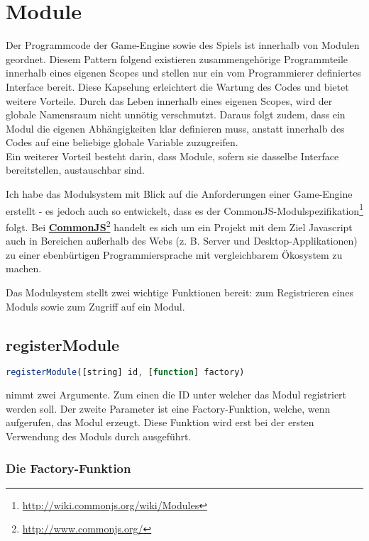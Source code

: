 \chapter{Module}

Der Programmcode der Game-Engine sowie des Spiels ist innerhalb von Modulen geordnet. Diesem Pattern folgend existieren zusammengehörige Programmteile innerhalb eines eigenen Scopes und stellen nur ein vom Programmierer definiertes Interface bereit. Diese Kapselung erleichtert die Wartung des Codes und bietet weitere Vorteile. Durch das Leben innerhalb eines eigenen Scopes, wird der globale Namensraum nicht unnötig verschmutzt. Daraus folgt zudem, dass ein Modul die eigenen Abhängigkeiten klar definieren muss, anstatt innerhalb des Codes auf eine beliebige globale Variable zuzugreifen.\\
Ein weiterer Vorteil besteht darin, dass Module, sofern sie dasselbe Interface bereitstellen, austauschbar sind. 

Ich habe das Modulsystem mit Blick auf die Anforderungen einer Game-Engine erstellt - es jedoch auch so entwickelt, dass es der CommonJS-Modulspezifikation\footnote{\url{http://wiki.commonjs.org/wiki/Modules}} folgt. Bei \textbf{\href{http://www.commonjs.org/}{CommonJS}}\footnote{\url{http://www.commonjs.org/}} handelt es sich um ein Projekt mit dem Ziel Javascript auch in Bereichen außerhalb des Webs (z. B. Server und Desktop-Applikationen) zu einer ebenbürtigen Programmiersprache mit vergleichbarem Ökosystem zu machen.

Das Modulsystem stellt zwei wichtige Funktionen bereit:  zum Registrieren eines Moduls sowie  zum Zugriff auf ein Modul.

\section{registerModule}

\begin{lstlisting}[language=JavaScript]
registerModule([string] id, [function] factory) 
\end{lstlisting}

 nimmt zwei Argumente. Zum einen die ID unter welcher das Modul registriert werden soll. Der zweite Parameter ist eine Factory-Funktion, welche, wenn aufgerufen, das Modul erzeugt. Diese Funktion wird erst bei der ersten Verwendung des Moduls durch  ausgeführt.

\subsection{Die Factory-Funktion}

